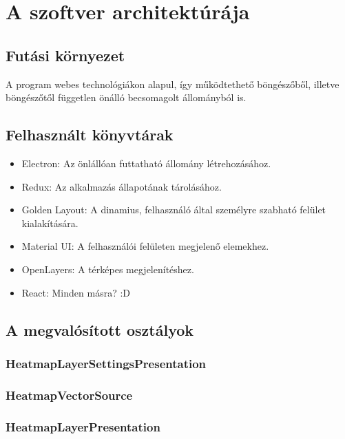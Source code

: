 \section{A szoftver architektúrája}

\subsection{Futási környezet}

A program webes technológiákon alapul, így működtethető böngészőből, illetve böngészőtől független önálló becsomagolt állományból is.

\subsection{Felhasznált könyvtárak}

\begin{itemize}
  \item Electron: Az önlállóan futtatható állomány létrehozásához.

  \item Redux: Az alkalmazás állapotának tárolásához.
  \item Golden Layout: A dinamius, felhasználó által személyre szabható felület kialakítására.

  \item Material UI: A felhasználói felületen megjelenő elemekhez.

  \item OpenLayers: A térképes megjelenítéshez.

  \item React: Minden másra? :D
\end{itemize}

\subsection{A megvalósított osztályok}

\subsubsection{HeatmapLayerSettingsPresentation}
\subsubsection{HeatmapVectorSource}
\subsubsection{HeatmapLayerPresentation}

